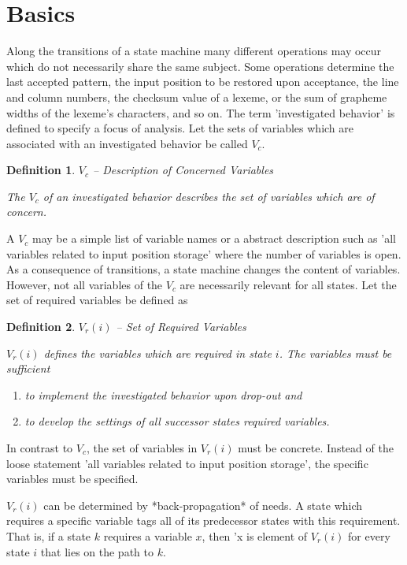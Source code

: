 \documentclass[12pt,a4paper]{scrartcl}
\theoremstyle{break}
\newtheorem{definition}{Definition}
\begin{document}
\section{Basics}

Along the transitions of a state machine many different operations may occur
which do not necessarily share the same subject. Some operations determine the
last accepted pattern, the input position to be restored upon acceptance, the
line and column numbers, the checksum value of a lexeme, or the sum of grapheme
widths of the lexeme's characters, and so on. The term 'investigated behavior'
is defined to specify a focus of analysis.  Let the sets of variables which are
associated with an investigated behavior be called $V_c$.

\begin{definition}
$V_c$ -- Description of Concerned Variables

The $V_c$ of an investigated behavior describes the set of variables which
are of concern. 
\end{definition}

A $V_c$ may be a simple list of variable names or a abstract description such
as 'all variables related to input position storage' where the number of
variables is open.  As a consequence of transitions, a state machine changes
the content of variables. However, not all variables of the $V_c$ are necessarily
relevant for all states. Let the set of required variables be defined as

\begin{definition}
$V_r(i)$ -- Set of Required Variables

$V_r(i)$ defines the variables which are required in state $i$. The
variables must be sufficient

\begin{enumerate}
\item  to implement the investigated behavior upon drop-out and
\item to develop the settings of all successor states required variables.
\end{enumerate}
\end{definition}

In contrast to $V_c$, the set of variables in $V_r(i)$ must be concrete.
Instead of the loose statement 'all variables related to input position
storage', the specific variables must be specified. 

$V_r(i)$ can be determined by *back-propagation* of needs. A state which
requires a specific variable tags all of its predecessor states with this
requirement. That is, if a state $k$ requires a variable $x$, then 'x is
element of $V_r(i)$ for every state $i$ that lies on the path to $k$.
\end{document}

